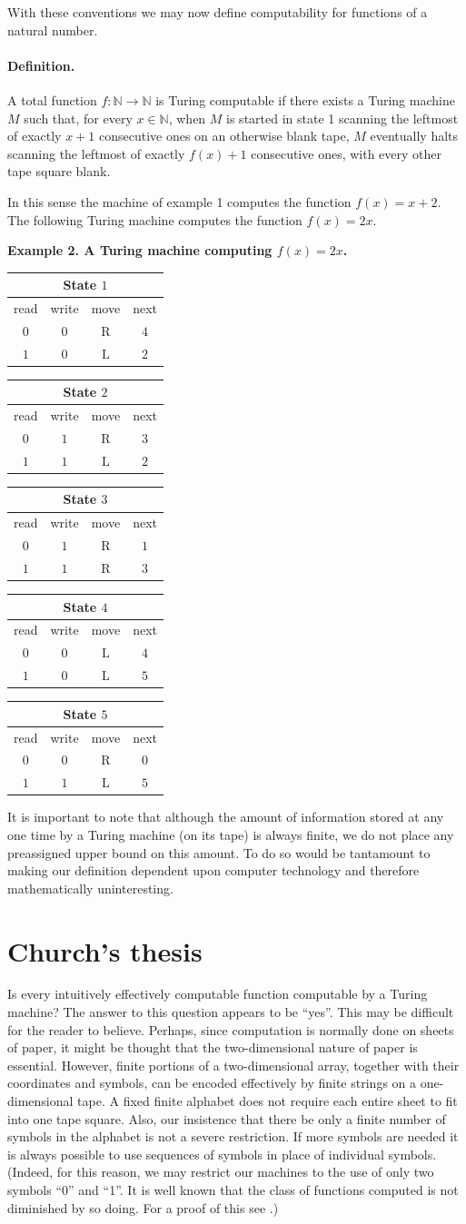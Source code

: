 \documentclass[11pt]{article}
\makeatletter
\newcommand{\origpage}[1]{\marginnote{\footnotesize\textbf{[#1]}}}
\newcommand{\card}[7]{%
\begingroup\setlength{\tabcolsep}{4.1pt}\renewcommand{\arraystretch}{1.13}%
\begin{tabular}{@{}c|ccc@{}}\multicolumn{4}{c}{\textbf{State $#1$}}\\
\toprule
\scriptsize read & \scriptsize write & \scriptsize move & \scriptsize next\\
\midrule
$0$ & $#2$ & $\mathrm{#3}$ & $#4$\\
$1$ & $#5$ & $\mathrm{#6}$ & $#7$\\
\bottomrule
\end{tabular}\endgroup}
\makeatother
\begin{document}
With these conventions we may now define computability for functions of a natural number.

\paragraph{Definition.} \origpage{731}A total function $f:\mathbb N\to\mathbb N$ is Turing computable if there exists a Turing machine $M$ such that, for every $x\in\mathbb N$, when $M$ is started in state 1 scanning the leftmost of exactly $x+1$ consecutive ones on an otherwise blank tape, $M$ eventually halts scanning the leftmost of exactly $f(x)+1$ consecutive ones, with every other tape square blank.

In this sense the machine of example 1 computes the function $f(x)=x+2$. The following Turing machine computes the function $f(x)=2 x$.

\begin{center}
\textbf{Example 2. A Turing machine computing $f(x)=2x$.}\par\smallskip
\card{1}{0}{R}{4}{0}{L}{2}\quad
\card{2}{1}{R}{3}{1}{L}{2}\quad
\card{3}{1}{R}{1}{1}{R}{3}\quad
\card{4}{0}{L}{4}{0}{L}{5}\quad
\card{5}{0}{R}{0}{1}{L}{5}
\end{center}

It is important to note that although the amount of information stored at any one time by a Turing machine (on its tape) is always finite, we do not place any preassigned upper bound on this amount. To do so would be tantamount to making our definition dependent upon computer technology and therefore mathematically uninteresting.
\section{Church's thesis} Is every intuitively effectively computable function computable by a Turing machine? The answer to this question appears to be ``yes''. This may be difficult for the reader to believe. Perhaps, since computation is normally done on sheets of paper, it might be thought that the two-dimensional nature of paper is essential. However, finite portions of a two-dimensional array, together with their coordinates and symbols, can be encoded effectively by finite strings on a one-dimensional tape. A fixed finite alphabet does not require each entire sheet to fit into one tape square. Also, our insistence that there be only a finite number of symbols in the alphabet is not a severe restriction. If more symbols are needed it is always possible to use sequences of symbols in place of individual symbols. (Indeed, for this reason, we may restrict our machines to the use of only two symbols ``0'' and ``1''. It is well known that the class of functions computed is not diminished by so doing. For a proof of this see \cite[p.~129]{r26}.)
\end{document}
